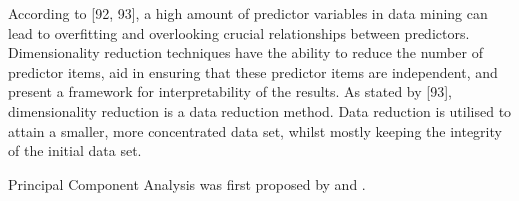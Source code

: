 
According to \textcite{DataMiningAndPredictiveAnalytics}[92, 93], a high amount of predictor variables in data mining can lead to overfitting and overlooking crucial relationships between predictors. Dimensionality reduction techniques have the ability to reduce the number of predictor items, aid in ensuring that these predictor items are independent, and present a framework for interpretability of the results.
As stated by \textcite{han2011data}[93], dimensionality reduction is a data reduction method. Data reduction is utilised to attain a smaller, more concentrated data set, whilst mostly keeping the integrity of the initial data set. 



Principal Component Analysis was first proposed by \textcite{OnLinesAndPlanes1901} and \textcite{hotelling1933analysis}.


